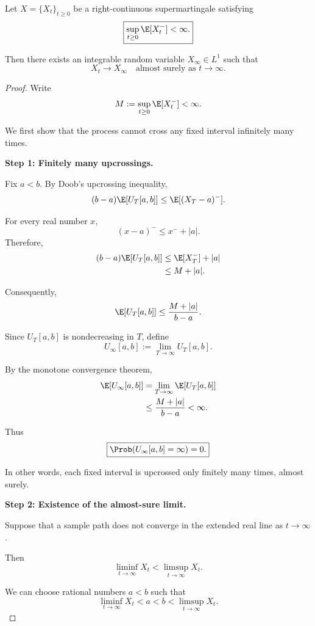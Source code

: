 \begin{theorem}
Let $X=\{X_t\}_{t\geq0}$ be a right-continuous
supermartingale satisfying
\[
    \boxed{
    \sup_{t\geq0}\E[X_t^-]<\infty.
    }
\]

Then there exists an integrable random variable
$X_\infty\in L^1$ such that
\[
    \boxed{
    X_t\longrightarrow X_\infty
    \quad\text{almost surely as }t\to\infty.
    }
\]
\end{theorem}

\begin{proof}
Write
\[
    M:=\sup_{t\geq0}\E[X_t^-]<\infty.
\]

We first show that the process cannot cross any
fixed interval infinitely many times.

\medskip
\noindent
\textbf{Step 1: Finitely many upcrossings.}

Fix $a<b$. By Doob's upcrossing inequality,
\[
    (b-a)\E[U_T[a,b]]
    \leq \E[(X_T-a)^-].
\]

For every real number $x$,
\[
    (x-a)^-\leq x^-+|a|.
\]
Therefore,
\[
\begin{aligned}
    (b-a)\E[U_T[a,b]]
    &\leq \E[X_T^-]+|a|\\
    &\leq M+|a|.
\end{aligned}
\]

Consequently,
\[
    \E[U_T[a,b]]
    \leq\frac{M+|a|}{b-a}.
\]

Since $U_T[a,b]$ is nondecreasing in $T$, define
\[
    U_\infty[a,b]
    :=\lim_{T\to\infty}U_T[a,b].
\]

By the monotone convergence theorem,
\[
\begin{aligned}
    \E[U_\infty[a,b]]
    &=\lim_{T\to\infty}\E[U_T[a,b]]\\
    &\leq\frac{M+|a|}{b-a}<\infty.
\end{aligned}
\]

Thus
\[
    \boxed{
    \Prob(U_\infty[a,b]=\infty)=0.
    }
\]

In other words, each fixed interval is upcrossed
only finitely many times, almost surely.

\medskip
\noindent
\textbf{Step 2: Existence of the almost-sure limit.}

Suppose that a sample path does not converge in
the extended real line as $t\to\infty$.

Then
\[
    \liminf_{t\to\infty}X_t
    <
    \limsup_{t\to\infty}X_t.
\]

We can choose rational numbers $a<b$ such that
\[
    \liminf_{t\to\infty}X_t
    <a<b<
    \limsup_{t\to\infty}X_t.
\]


\end{proof}
